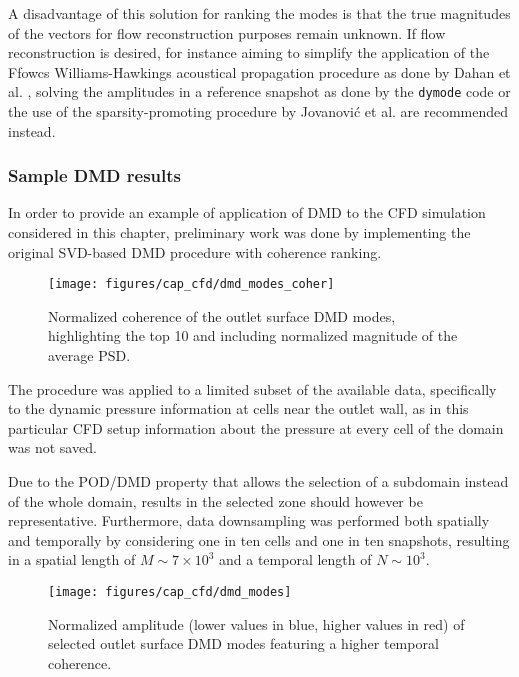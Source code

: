 A disadvantage of this solution for ranking the modes is that the true magnitudes of the vectors for flow reconstruction purposes remain unknown. If flow reconstruction is desired, for instance aiming to simplify the application of the Ffowcs Williams-Hawkings acoustical propagation procedure \cite{williams1969sound} as done by Dahan et al. \cite{dahan2014aero}, solving the amplitudes in a reference snapshot as done by the \texttt{dymode} code \cite{futrzynski2015dymode} or the use of the sparsity-promoting procedure by Jovanovi{\'c} et al. \cite{jovanovic2014sparsity} are recommended instead.

\subsubsection{Sample DMD results}

In order to provide an example of application of DMD to the CFD simulation considered in this chapter, preliminary work was done by implementing the original SVD-based DMD procedure with coherence ranking.

\begin{figure}[b!]
\centering
\texttt{[image: figures/cap\_cfd/dmd\_modes\_coher]}
\caption[Normalized coherence of the outlet surface DMD modes]{Normalized coherence of the outlet surface DMD modes, highlighting the top 10 and including normalized magnitude of the average PSD.}
\label{fig:dmd_modes_coher}
\end{figure}

The procedure was applied to a limited subset of the available data, specifically to the dynamic pressure information at cells near the outlet wall, as in this particular CFD setup information about the pressure at every cell of the domain was not saved. 

Due to the POD/DMD property that allows the selection of a subdomain instead of the whole domain, results in the selected zone should however be representative. Furthermore, data downsampling was performed both spatially and temporally by considering one in ten cells and one in ten snapshots, resulting in a spatial length of $M\sim 7\times 10^3$ and a temporal length of $N\sim 10^3$.

\begin{figure}[hb!]
\centering
\texttt{[image: figures/cap\_cfd/dmd\_modes]}
\caption[Normalized amplitude of selected DMD modes (coherence)]{Normalized amplitude (lower values in blue, higher values in red) of selected outlet surface DMD modes featuring a higher temporal coherence.}
\label{fig:dmd_modes}
\end{figure}

